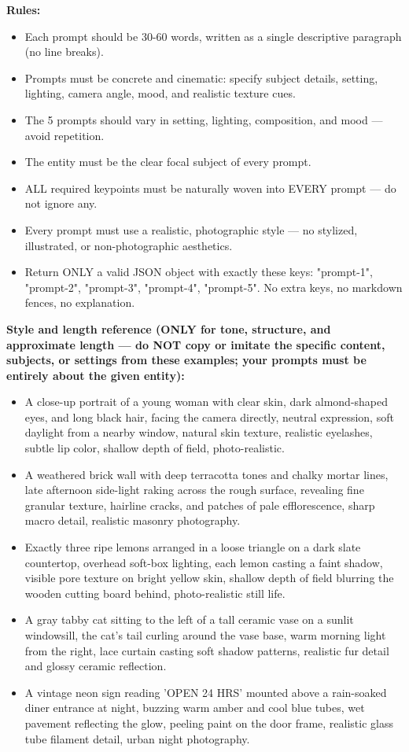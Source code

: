 \begin{tcolorbox}
\textbf{Rules:}
\begin{itemize}[leftmargin=1.5em, nosep]
    \item Each prompt should be 30-60 words, written as a single descriptive paragraph (no line breaks).
    \item Prompts must be concrete and cinematic: specify subject details, setting, lighting, camera angle, mood, and realistic texture cues.
    \item The 5 prompts should vary in setting, lighting, composition, and mood — avoid repetition.
    \item The entity must be the clear focal subject of every prompt.
    \item ALL required keypoints must be naturally woven into EVERY prompt — do not ignore any.
    \item Every prompt must use a realistic, photographic style — no stylized, illustrated, or non-photographic aesthetics.
    \item Return ONLY a valid JSON object with exactly these keys: "prompt-1", "prompt-2", "prompt-3", "prompt-4", "prompt-5". No extra keys, no markdown fences, no explanation.
\end{itemize}

\textbf{Style and length reference (ONLY for tone, structure, and approximate length — do NOT copy or imitate the specific content, subjects, or settings from these examples; your prompts must be entirely about the given entity):}
\begin{itemize}[leftmargin=1.5em, nosep]
    \item A close-up portrait of a young woman with clear skin, dark almond-shaped eyes, and long black hair, facing the camera directly, neutral expression, soft daylight from a nearby window, natural skin texture, realistic eyelashes, subtle lip color, shallow depth of field, photo-realistic.
    \item A weathered brick wall with deep terracotta tones and chalky mortar lines, late afternoon side-light raking across the rough surface, revealing fine granular texture, hairline cracks, and patches of pale efflorescence, sharp macro detail, realistic masonry photography.
    \item Exactly three ripe lemons arranged in a loose triangle on a dark slate countertop, overhead soft-box lighting, each lemon casting a faint shadow, visible pore texture on bright yellow skin, shallow depth of field blurring the wooden cutting board behind, photo-realistic still life.
    \item A gray tabby cat sitting to the left of a tall ceramic vase on a sunlit windowsill, the cat's tail curling around the vase base, warm morning light from the right, lace curtain casting soft shadow patterns, realistic fur detail and glossy ceramic reflection.
    \item A vintage neon sign reading 'OPEN 24 HRS' mounted above a rain-soaked diner entrance at night, buzzing warm amber and cool blue tubes, wet pavement reflecting the glow, peeling paint on the door frame, realistic glass tube filament detail, urban night photography.
\end{itemize}
\end{tcolorbox}

